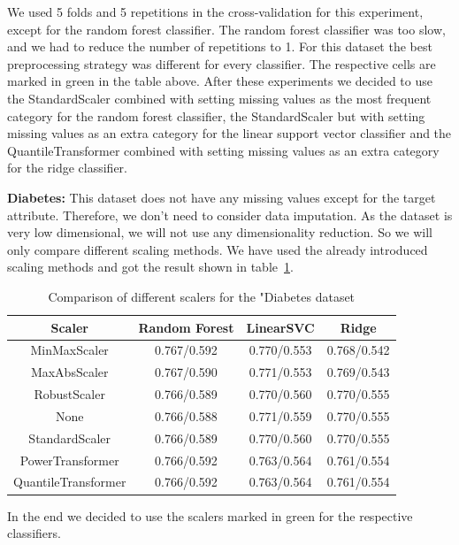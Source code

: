 \documentclass[a4paper,10pt]{article}
\begin{document}
We used 5 folds and 5 repetitions in the cross-validation for this experiment, except for the random forest
classifier. The random forest classifier was too slow, and we had to reduce the number of repetitions to 1.
For this dataset the best
preprocessing strategy was different for every classifier. The respective cells are marked in green in the
table above. After these experiments we decided to use the StandardScaler combined with setting missing
values as the most frequent category for the random forest classifier, the StandardScaler but with setting
missing values as an extra category for the linear support vector classifier and the QuantileTransformer
combined with setting missing values as an extra category for the ridge classifier.

\textbf{Diabetes:} This dataset does not have any missing values except for the target attribute. Therefore, we 
 don't need to consider data imputation. As the dataset is very low dimensional, we will not use any dimensionality reduction. 
 So we will only compare different scaling methods. We have used the already introduced scaling methods 
 and got the result shown in table~\ref{table:diabetesscalers}.
 \begin{table}[h!]
\centering
\begin{tabular}{|c|c|c|c|}
\hline
\textbf{Scaler} & \textbf{Random Forest } & \textbf{LinearSVC } & \textbf{Ridge } \\
\hline
MinMaxScaler & \cellcolor[HTML]{C1E1C1}0.767/0.592 & 0.770/0.553 & 0.768/0.542 \\
\hline
MaxAbsScaler & 0.767/0.590 & 0.771/0.553 & 0.769/0.543 \\
\hline
RobustScaler & 0.766/0.589 & 0.770/0.560 & 0.770/0.555 \\
\hline
None & 0.766/0.588 & \cellcolor[HTML]{C1E1C1}0.771/0.559 & 0.770/0.555 \\
\hline
StandardScaler & 0.766/0.589 & 0.770/0.560 & \cellcolor[HTML]{C1E1C1}0.770/0.555 \\
\hline
PowerTransformer & 0.766/0.592 & 0.763/0.564 & 0.761/0.554 \\
\hline
QuantileTransformer & 0.766/0.592 & 0.763/0.564 & 0.761/0.554 \\
\hline
\end{tabular}
\caption{Comparison of different scalers for the "Diabetes dataset}
\label{table:diabetesscalers}
\end{table}
In the end we decided to use the scalers marked in green for the respective classifiers.\\
\end{document}
